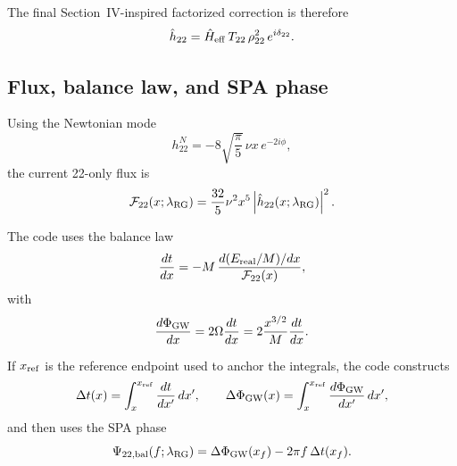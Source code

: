 \documentclass[11pt]{article}
\begin{document}
The final Section~IV-inspired factorized correction is therefore
\begin{equation}
  \hat h_{22}
  =
  \hat H_{\rm eff}\,T_{22}\,\rho_{22}^2\,e^{i\delta_{22}}.
\end{equation}

\subsection{Flux, balance law, and SPA phase}

Using the Newtonian mode
\begin{equation}
  h_{22}^N = -8\sqrt{\frac{\pi}{5}}\,\nu x\,e^{-2i\phi},
\end{equation}
the current 22-only flux is
\begin{equation}
  \mathcal F_{22}(x;\lambda_{\rm RG})
  =
  \frac{32}{5}\nu^2 x^5
  \left|
    \hat h_{22}(x;\lambda_{\rm RG})
  \right|^2.
\end{equation}

The code uses the balance law
\begin{equation}
  \frac{dt}{dx}
  =
  -M\,
  \frac{d(E_{\rm real}/M)/dx}{\mathcal F_{22}(x)},
\end{equation}
with
\begin{equation}
  \frac{d\Phi_{\rm GW}}{dx}
  =
  2\Omega \frac{dt}{dx}
  =
  2\frac{x^{3/2}}{M}\frac{dt}{dx}.
\end{equation}

If \(x_{\rm ref}\) is the reference endpoint used to anchor the integrals, the
code constructs
\begin{equation}
  \Delta t(x)
  = \int_x^{x_{\rm ref}} \frac{dt}{dx'}\,dx',
  \qquad
  \Delta \Phi_{\rm GW}(x)
  = \int_x^{x_{\rm ref}} \frac{d\Phi_{\rm GW}}{dx'}\,dx',
\end{equation}
and then uses the SPA phase
\begin{equation}
  \Psi_{22,{\rm bal}}(f;\lambda_{\rm RG})
  =
  \Delta \Phi_{\rm GW}(x_f)
  - 2\pi f\,\Delta t(x_f).
\end{equation}
\end{document}
